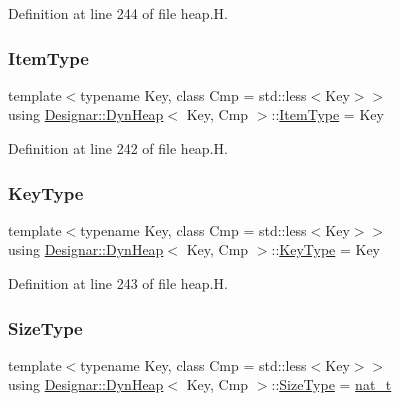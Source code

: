 Definition at line 244 of file heap.\+H.

\mbox{\label{class_designar_1_1_dyn_heap_a8b4add310e82b260912210069852febc}} 
\subsubsection{\texorpdfstring{Item\+Type}{ItemType}}
{\footnotesize\ttfamily template$<$typename Key, class Cmp = std\+::less$<$\+Key$>$$>$ \\
using \hyperlink{class_designar_1_1_dyn_heap}{Designar\+::\+Dyn\+Heap}$<$ Key, Cmp $>$\+::\hyperlink{class_designar_1_1_fixed_array_abfeb4e683cee75ae782ad20294c4c808}{Item\+Type} =  Key}



Definition at line 242 of file heap.\+H.

\mbox{\label{class_designar_1_1_dyn_heap_aa7260c4d35ad97e41f779bcf2b41808b}} 
\subsubsection{\texorpdfstring{Key\+Type}{KeyType}}
{\footnotesize\ttfamily template$<$typename Key, class Cmp = std\+::less$<$\+Key$>$$>$ \\
using \hyperlink{class_designar_1_1_dyn_heap}{Designar\+::\+Dyn\+Heap}$<$ Key, Cmp $>$\+::\hyperlink{class_designar_1_1_fixed_array_a3a725cf21783340b8aca29dd1db0acf0}{Key\+Type} =  Key}



Definition at line 243 of file heap.\+H.

\mbox{\label{class_designar_1_1_dyn_heap_aa5d0813645a3a87407d2c95f0f4d5cad}} 
\subsubsection{\texorpdfstring{Size\+Type}{SizeType}}
{\footnotesize\ttfamily template$<$typename Key, class Cmp = std\+::less$<$\+Key$>$$>$ \\
using \hyperlink{class_designar_1_1_dyn_heap}{Designar\+::\+Dyn\+Heap}$<$ Key, Cmp $>$\+::\hyperlink{class_designar_1_1_fixed_array_a503ae414cc313d248e77c08e62ef043c}{Size\+Type} =  \hyperlink{namespace_designar_aa72662848b9f4815e7bf31a7cf3e33d1}{nat\+\_\+t}}




